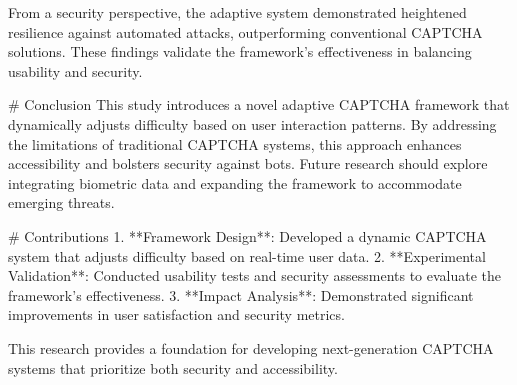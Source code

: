 From a security perspective, the adaptive system demonstrated heightened resilience against automated attacks, outperforming conventional CAPTCHA solutions. These findings validate the framework's effectiveness in balancing usability and security.

# Conclusion  
This study introduces a novel adaptive CAPTCHA framework that dynamically adjusts difficulty based on user interaction patterns. By addressing the limitations of traditional CAPTCHA systems, this approach enhances accessibility and bolsters security against bots. Future research should explore integrating biometric data and expanding the framework to accommodate emerging threats.

# Contributions  
1. **Framework Design**: Developed a dynamic CAPTCHA system that adjusts difficulty based on real-time user data.  
2. **Experimental Validation**: Conducted usability tests and security assessments to evaluate the framework's effectiveness.  
3. **Impact Analysis**: Demonstrated significant improvements in user satisfaction and security metrics.  

This research provides a foundation for developing next-generation CAPTCHA systems that prioritize both security and accessibility.